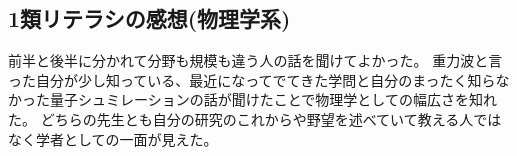 \documentclass[dvipdfmx]{jsarticle}
\begin{document}
\subsection{1類リテラシの感想(物理学系)}
前半と後半に分かれて分野も規模も違う人の話を聞けてよかった。
重力波と言った自分が少し知っている、最近になってでてきた学問と自分のまったく知らなかった量子シュミレーションの話が聞けたことで物理学としての幅広さを知れた。
どちらの先生とも自分の研究のこれからや野望を述べていて教える人ではなく学者としての一面が見えた。
\end{document}
